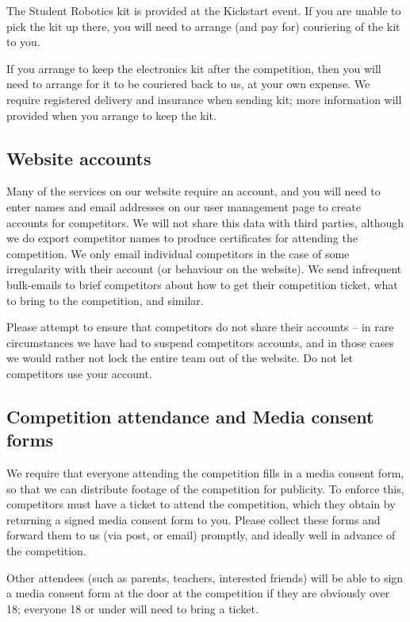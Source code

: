 \documentclass[a4paper]{article}
\begin{document}
The Student Robotics kit is provided at the Kickstart event. If you are unable
to pick the kit up there, you will need to arrange (and pay for) couriering of
the kit to you.

If you arrange to keep the electronics kit after the competition, then you will
need to arrange for it to be couriered back to us, at your own expense. We
require registered delivery and insurance when sending kit; more information
will provided when you arrange to keep the kit.

\subsection*{Website accounts}

Many of the services on our website require an account, and you will need to
enter names and email addresses on our user management page to create accounts
for competitors. We will not share this data with third parties, although we do
export competitor names to produce certificates for attending the competition.
We only email individual competitors in the case of some irregularity with
their account (or behaviour on the website). We send infrequent bulk-emails
to brief competitors about how to get their competition ticket, what to bring
to the competition, and similar.

Please attempt to ensure that competitors do not share their accounts -- in rare
circumstances we have had to suspend competitors accounts, and in those cases
we would rather not lock the entire team out of the website. Do not let
competitors use your account.

\subsection*{Competition attendance and Media consent forms}

We require that everyone attending the competition fills in a media consent
form, so that we can distribute footage of the competition for publicity.
To enforce this, competitors must have a ticket to attend the competition,
which they obtain by returning a signed media consent form to you. Please
collect these forms and forward them to us (via post, or email) promptly,
and ideally well in advance of the competition.

Other attendees (such as parents, teachers, interested friends) will be able
to sign a media consent form at the door at the competition if they are
obviously over 18; everyone 18 or under will need to bring a ticket.
\end{document}
